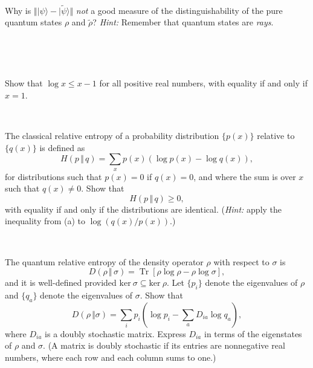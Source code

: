\documentclass[a4paper,11pt]{article}
\DeclareMathOperator{\Tr}{Tr}
\newcommand{\ket}[1]{|#1\rangle}
\newcommand{\mrm}[1]{\mathrm{#1}}
\begin{document}
~

 Why is $\Vert \ket{\psi} - \ket{\tilde \psi} \Vert$ \emph{not} a good measure of the distinguishability of the pure quantum states $\rho$ and $\tilde \rho$?
\textit{Hint:} Remember that quantum states are \textit{rays}.

~



~

 Show that $\log x \leq x-1$ for all positive real numbers, with equality if and only if $x = 1$.

~

 The classical relative entropy of a probability distribution $\{p(x)\}$ relative to $\{q(x)\}$ is defined as
\begin{equation}
H(p \, \Vert \, q) = \sum_x p(x) \left( \log p(x) - \log q(x) \right),
\end{equation}
for distributions such that $p(x)= 0$ if $q(x) = 0$, and where the sum is over $x$ such that $q(x) \neq 0$.
Show that
\begin{equation}
H(p \, \Vert \, q) \geq 0,
\end{equation}
with equality if and only if the distributions are identical. (\emph{Hint:} apply the inequality from (a) to $\log(q(x)/p(x))$.)

~

 The quantum relative entropy of the density operator $\rho$ with respect to $\sigma$ is
\begin{equation}
D(\rho \, \Vert \, \sigma) = \Tr\left[ \rho \log \rho - \rho \log \sigma \right],
\end{equation}
and it is well-defined provided $\mrm{ker}~\sigma \subseteq \mrm{ker}~\rho$.
Let $\{ p_i\}$ denote the eigenvalues of $\rho$ and $\{q_a\}$ denote the eigenvalues of $\sigma$. Show that
\begin{equation}
D(\rho \, \Vert \sigma) = \sum_i p_i \left( \log p_i - \sum_a D_{ia} \log q_a \right),
\end{equation}
where $D_{ia}$ is a doubly stochastic matrix.
Express $D_{ia}$ in terms of the eigenstates of $\rho$ and $\sigma$. (A matrix is doubly stochastic if its entries are nonnegative real numbers, where each row and each column sums to one.)
\end{document}
